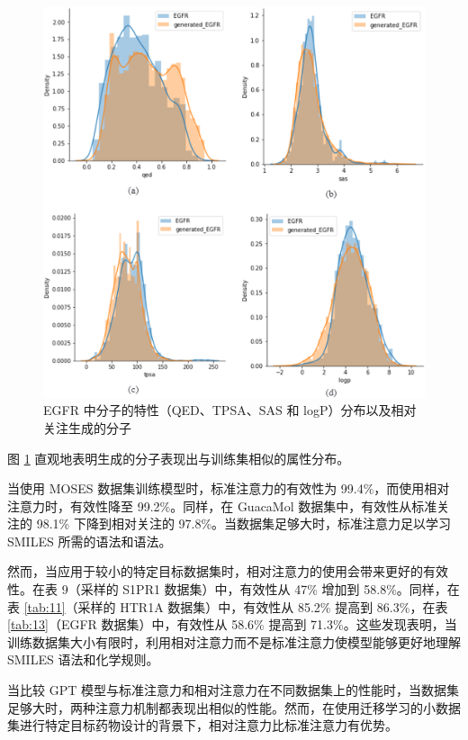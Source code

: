 \begin{figure}[H]
  \centering
  \includegraphics[width=\linewidth]{figures/9.png}
  \caption{EGFR 中分子的特性（QED、TPSA、SAS 和 logP）分布以及相对关注生成的分子}
  \label{fig:9}
\end{figure}

图 \ref{fig:9} 直观地表明生成的分子表现出与训练集相似的属性分布。

当使用 MOSES 数据集训练模型时，标准注意力的有效性为 99.4\%，而使用相对注意力时，有效性降至 99.2\%。同样，在 GuacaMol 数据集中，有效性从标准关注的 98.1\% 下降到相对关注的 97.8\%。当数据集足够大时，标准注意力足以学习 SMILES 所需的语法和语法。

然而，当应用于较小的特定目标数据集时，相对注意力的使用会带来更好的有效性。在表 9（采样的 S1PR1 数据集）中，有效性从 47\% 增加到 58.8\%。同样，在表 \ref{tab:11}（采样的 HTR1A 数据集）中，有效性从 85.2\% 提高到 86.3\%，在表 \ref{tab:13}（EGFR 数据集）中，有效性从 58.6\% 提高到 71.3\%。这些发现表明，当训练数据集大小有限时，利用相对注意力而不是标准注意力使模型能够更好地理解 SMILES 语法和化学规则。

当比较 GPT 模型与标准注意力和相对注意力在不同数据集上的性能时，当数据集足够大时，两种注意力机制都表现出相似的性能。然而，在使用迁移学习的小数据集进行特定目标药物设计的背景下，相对注意力比标准注意力有优势。

